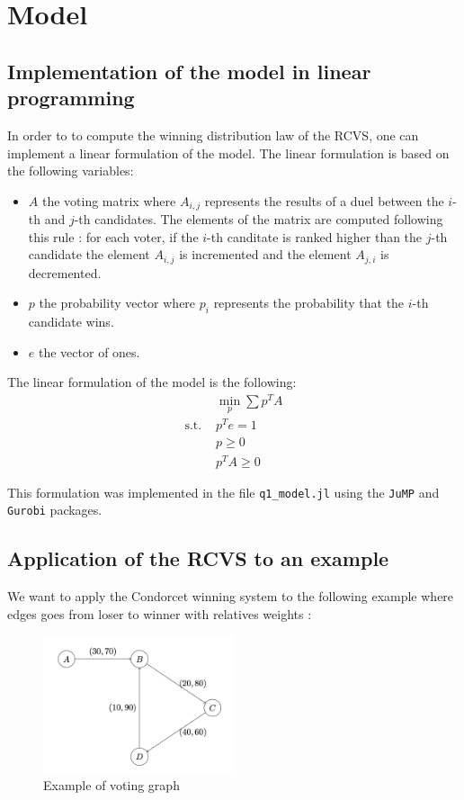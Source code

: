 \section{Model}

\subsection{Implementation of the model in linear programming}
\label{sec:model}
In order to to compute the winning distribution law of the RCVS, one can implement a linear formulation of the model.
The linear formulation is based on the following variables:
\begin{itemize}
  \item $A$ the voting matrix where $A_{i,j}$ represents the results of a duel between the $i$-th and $j$-th candidates.
  The elements of the matrix are computed following this rule : for each voter, if the $i$-th canditate is ranked higher than the $j$-th candidate the element $A_{i,j}$ is incremented
  and the element $A_{j,i}$ is decremented.
  \item $p$ the probability vector where $p_i$ represents the probability that the $i$-th candidate wins.
  \item $e$ the vector of ones.
\end{itemize}

The linear formulation of the model is the following:
\begin{align*}
  &\min_{p} \sum p^T A\\
  \text{s.t. } &p^T e = 1\\
  &p \geq 0\\
  &p^T A \geq 0  
\end{align*}

This formulation was implemented in the file \verb|q1_model.jl| using the \verb|JuMP| and \verb|Gurobi| packages.

\subsection{Application of the RCVS to an example}
We want to apply the Condorcet winning system to the following example where edges goes from loser to winner with relatives weights :

\begin{figure}[!h]
  \centering
  \includegraphics[width=0.5\textwidth]{figs/graph.png}
  \caption{Example of voting graph}
  \label{fig:q1_example}
\end{figure}

